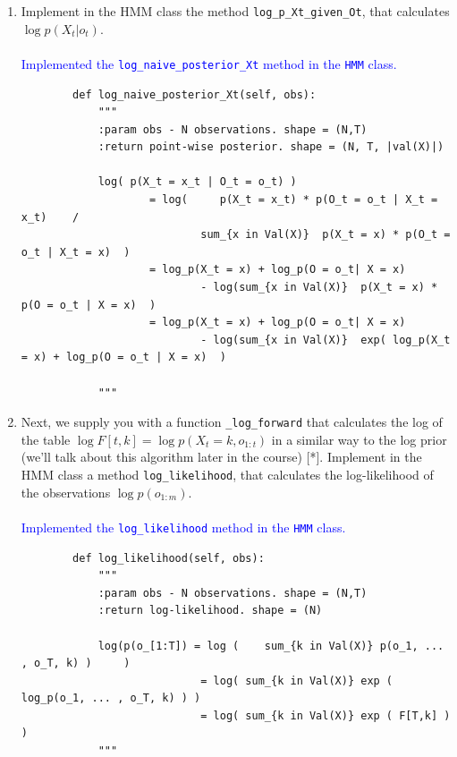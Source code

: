 \documentclass[a4 paper]{article}
\begin{document}
\begin{enumerate}
    \item Implement in the HMM class the method \texttt{log\_p\_Xt\_given\_Ot}, that calculates \( \log p(X_t | o_t) \). 
    \\ 
    \\ \textcolor{blue}{
        Implemented the \texttt{log\_naive\_posterior\_Xt} method in the \texttt{HMM} class.
    }
    \begin{verbatim}
        def log_naive_posterior_Xt(self, obs):
            """
            :param obs - N observations. shape = (N,T)
            :return point-wise posterior. shape = (N, T, |val(X)|)

            log( p(X_t = x_t | O_t = o_t) ) 
                    = log(     p(X_t = x_t) * p(O_t = o_t | X_t = x_t)    /    
                            sum_{x in Val(X)}  p(X_t = x) * p(O_t = o_t | X_t = x)  )
                    = log_p(X_t = x) + log_p(O = o_t| X = x) 
                            - log(sum_{x in Val(X)}  p(X_t = x) * p(O = o_t | X = x)  )
                    = log_p(X_t = x) + log_p(O = o_t| X = x) 
                            - log(sum_{x in Val(X)}  exp( log_p(X_t = x) + log_p(O = o_t | X = x)  )

            """
    \end{verbatim}
    
    \item Next, we supply you with a function \texttt{\_log\_forward} that calculates the log of the table \( \log F[t, k] = \log p(X_t = k, o_{1:t}) \) in a similar way to the log prior
     (we’ll talk about this algorithm later in the course) [*]. Implement in the HMM class a method \texttt{log\_likelihood}, that calculates the log-likelihood of the observations \( \log p(o_{1:m}) \).
    \\
    \\ \textcolor{blue}{
        Implemented the \texttt{log\_likelihood} method in the \texttt{HMM} class.
    }

    \begin{verbatim}
        def log_likelihood(self, obs):
            """
            :param obs - N observations. shape = (N,T)
            :return log-likelihood. shape = (N)

            log(p(o_[1:T]) = log (    sum_{k in Val(X)} p(o_1, ... , o_T, k) )     )
                            = log( sum_{k in Val(X)} exp ( log_p(o_1, ... , o_T, k) ) )
                            = log( sum_{k in Val(X)} exp ( F[T,k] )    )
            """
    \end{verbatim}
    

\end{enumerate}
\end{document}
